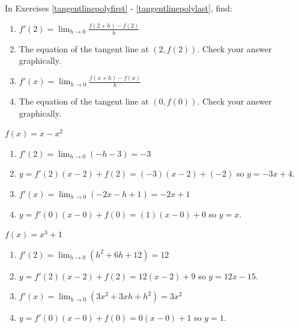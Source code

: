 \documentclass{ximera}
\begin{document}
\begin{question}
In Exercises \ref{tangentlinepolyfirst} - \ref{tangentlinepolylast}, find:

\begin{enumerate}

\item  $f'(2)  = \lim_{h \rightarrow 0} \frac{f(2+h) - f(2)}{h}$

\item  The equation of the tangent line at $(2, f(2))$.  Check your answer graphically.

\item  $f'(x) = \lim_{h \rightarrow 0} \frac{f(x+h) - f(x)}{h}$

\item  The equation of the tangent line at $(0,f(0))$.  Check your answer graphically.
 
\end{enumerate}

\begin{problem} \label{tangentlinepolyfirst}  
$f(x) = x-x^2$ 

\begin{solution}
\begin{enumerate}  

\item $f'(2) = \lim_{h \rightarrow 0} (-h-3) = -3$

\item  $y = f'(2)(x-2) + f(2) = (-3)(x-2)+(-2)$ so $y  = -3x+4$.

\item   $f'(x) =  \lim_{h \rightarrow 0} (-2x-h+1) = -2x+1$ 

\item  $y = f'(0)(x-0) + f(0) = (1)(x-0) + 0$ so $y = x$.

\end{enumerate}
\end{solution}
\end{problem}

\begin{problem} \label{tangentlinepolylast} 
$f(x) = x^{3} + 1$

\begin{solution}
\begin{enumerate}

\item $f'(2) = \lim_{h \rightarrow 0} \left( h^2+6h+12 \right) = 12$

\item  $y = f'(2)(x-2) + f(2) = 12(x-2)+ 9$ so $y = 12x - 15$.

\item  $f'(x) = \lim_{h \rightarrow 0} \left(3x^{2} + 3xh + h^{2} \right) = 3x^{2}$ 

\item $y = f'(0)(x-0)+f(0) = 0(x-0)+1$ so $y = 1$.

\end{enumerate} 
\end{solution}
\end{problem}

\end{question}
\end{document}
